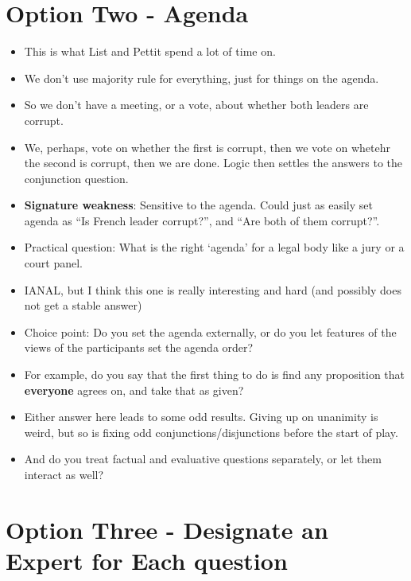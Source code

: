 \documentclass[11pt,]{article}
\providecommand{\tightlist}{%
  \setlength{\itemsep}{0pt}\setlength{\parskip}{0pt}}
\begin{document}
\hypertarget{option-two---agenda}{%
\section{Option Two - Agenda}\label{option-two---agenda}}

\begin{itemize}
\tightlist
\item
  This is what List and Pettit spend a lot of time on.
\item
  We don't use majority rule for everything, just for things on the
  agenda.
\item
  So we don't have a meeting, or a vote, about whether both leaders are
  corrupt.
\item
  We, perhaps, vote on whether the first is corrupt, then we vote on
  whetehr the second is corrupt, then we are done. Logic then settles
  the answers to the conjunction question.
\item
  \textbf{Signature weakness}: Sensitive to the agenda. Could just as
  easily set agenda as ``Is French leader corrupt?'', and ``Are both of
  them corrupt?''.
\item
  Practical question: What is the right `agenda' for a legal body like a
  jury or a court panel.
\item
  IANAL, but I think this one is really interesting and hard (and
  possibly does not get a stable answer)
\item
  Choice point: Do you set the agenda externally, or do you let features
  of the views of the participants set the agenda order?
\item
  For example, do you say that the first thing to do is find any
  proposition that \textbf{everyone} agrees on, and take that as given?
\item
  Either answer here leads to some odd results. Giving up on unanimity
  is weird, but so is fixing odd conjunctions/disjunctions before the
  start of play.
\item
  And do you treat factual and evaluative questions separately, or let
  them interact as well?
\end{itemize}

\hypertarget{option-three---designate-an-expert-for-each-question}{%
\section{Option Three - Designate an Expert for Each
question}\label{option-three---designate-an-expert-for-each-question}}
\end{document}
